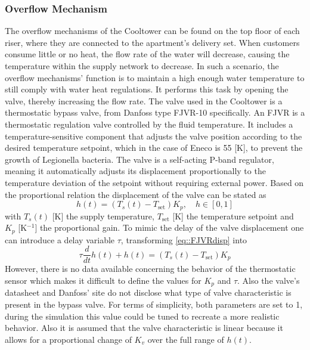 \subsubsection{Overflow Mechanism}\label{sec::overflowmech}
The overflow mechanisms of the Cooltower can be found on the top floor of each riser, where they are connected to the apartment's delivery set. When customers consume little or no heat, the flow rate of the water will decrease, causing the temperature within the supply network to decrease. In such a scenario, the overflow mechanisms' function is to maintain a high enough water temperature to still comply with water heat regulations. It performs this task by opening the valve, thereby increasing the flow rate. The valve used in the Cooltower is a thermostatic bypass valve, from Danfoss type FJVR-10 specifically. An FJVR is a thermostatic regulation valve controlled by the fluid temperature. It includes a temperature-sensitive component that adjusts the valve position according to the desired temperature setpoint, which in the case of Eneco is 55 [K], to prevent the growth of Legionella bacteria. The valve is a self-acting P-band regulator, meaning it automatically adjusts its displacement proportionally to the temperature deviation of the setpoint without requiring external power. Based on the proportional relation the displacement of the valve can be stated as
\begin{equation}\label{eq::FJVRdisp}
    h(t) = (T_s(t) - T_{\text{set}})K_p, \quad h \in [0,1]
\end{equation}
with $T_s(t)$ [K] the supply temperature, $T_{\text{set}}$ [K] the temperature setpoint and $K_p$ [K$^{-1}$] the proportional gain. To mimic the delay of the valve displacement one can introduce a delay variable $\tau$, transforming \ref{eq::FJVRdisp} into
\begin{equation}
    \tau \frac{d}{dt}h(t) + h(t) = (T_s(t) - T_{\text{set}})K_p 
\end{equation} 
However, there is no data available concerning the behavior of the thermostatic sensor which makes it difficult to define the values for $K_p$ and $\tau$. Also the valve's datasheet and Danfoss' site do not disclose what type of valve characteristic is present in the bypass valve. For terms of simplicity, both parameters are set to 1, during the simulation this value could be tuned to recreate a more realistic behavior. Also it is assumed that the valve characteristic is linear because it allows for a proportional change of $K_v$ over the full range of $h(t)$.

